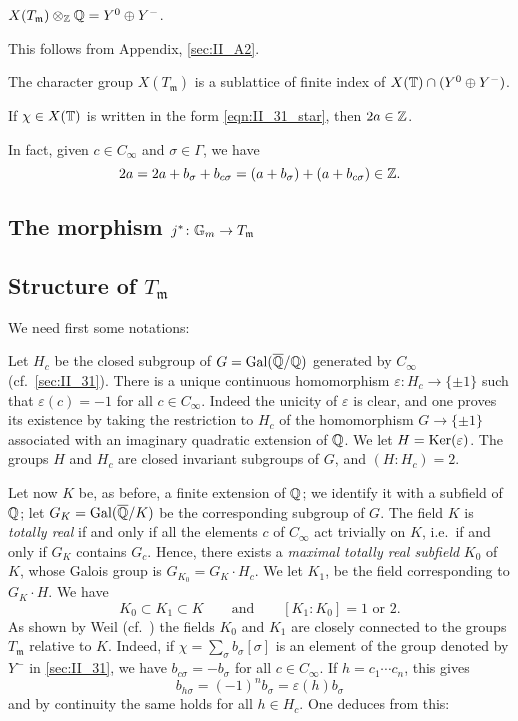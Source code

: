 \begin{prop}
	$X(T_{\mathfrak{m}}) \otimes_{\mathbb{Z}} \mathbb{Q} = Y^0 \oplus Y^-$.
\end{prop}
This follows from Appendix, \ref{sec:II_A2}.

\begin{corp}
	\dpage
	The character group $X(T_{\mathfrak{m}})$ is a sublattice of finite
	index of $X(\mathbb{T}) \cap (Y^0 \oplus Y^-)$.
\end{corp}
\begin{corp}
	If $\chi \in X(\mathbb{T})$ is written in the form \eqref{eqn:II_31_star},
	then $2a \in \mathbb{Z}$.
\end{corp}
In fact, given $c \in C_\infty$ and $\sigma \in \Gamma$, we have
\[
	2a = 2a + b_\sigma + b_{c\sigma} = (a+b_\sigma) + (a+b_{c\sigma}) \in
	\mathbb{Z}.
\]

\subsection{The morphism \texorpdfstring{$j^* \colon \mathbb{G}_m \to
T_{\mathfrak{m}}$}{j*: Gm -> Tm}}

\subsection{Structure of \texorpdfstring{$T_{\mathfrak{m}}$}{Tm}}
We need first some notations:

Let $H_c$ be the closed subgroup of $G = \operatorname{Gal}(\overline{\mathbb{Q}}/\mathbb{Q})$ generated by
$C_\infty$ (cf.\ \ref{sec:II_31}). There is a unique continuous homomorphism
\dpage
$\varepsilon \colon H_c \to \{ \pm 1 \}$ such that $\varepsilon(c) = -1$ for
all $c \in C_\infty$. Indeed the unicity of $\varepsilon$ is clear, and one
proves its existence by taking the restriction to $H_c$ of the homomorphism $G
\to \{ \pm 1 \}$ associated with an imaginary quadratic extension of $\mathbb{Q}$. We
let $H = \operatorname{Ker}(\varepsilon)$. The groups $H$ and $H_c$ are closed invariant
subgroups of $G$, and $(H: H_c) = 2$.

Let now $K$ be, as before, a finite extension of $\mathbb{Q}$; we identify
it with a subfield of $\mathbb{Q}$; let $G_K = \operatorname{Gal}(\overline{\mathbb{Q}}/K)$ be the corresponding
subgroup of $G$. The field $K$ is \emph{totally real} if and only if all the
elements $c$ of $C_\infty$ act trivially on $K$, i.e.\ if and only if $G_K$
contains $G_c$. Hence, there exists a \emph{maximal totally real subfield}
$K_0$ of $K$, whose Galois group is $G_{K_0} = G_K \cdot H_c$. We let $K_1$, be
the field corresponding to $G_K \cdot H$. We have
\[
	K_0 \subset K_1 \subset K \qquad \text{and} \qquad
	[K_1 : K_0] = 1 \text{ or } 2.
\]
As shown by Weil (cf.\ \cite[4]{47}) the fields $K_0$ and $K_1$ are closely
connected to the groups $T_{\mathfrak{m}}$ relative to $K$. Indeed, if $\chi =
\sum_{\sigma} b_\sigma[\sigma]$ is an element of the group denoted by $Y^-$ in
\ref{sec:II_31}, we have $b_{c\sigma} = -b_\sigma$ for all $c \in C_\infty$. If
$h = c_1 \cdots c_n$, this gives
\[
	b_{h\sigma} = (-1)^n b_\sigma = \varepsilon(h) b_\sigma
\]
and by continuity the same holds for all $h \in H_c$. One deduces from this:

